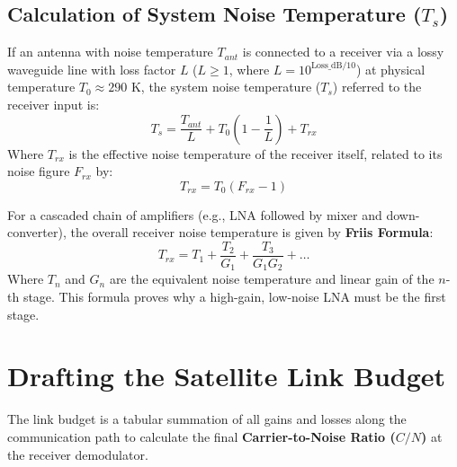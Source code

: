 \documentclass[12pt,a4paper]{article}
\begin{document}
\subsection{Calculation of System Noise Temperature ($T_s$)}
If an antenna with noise temperature $T_{ant}$ is connected to a receiver via a lossy waveguide line with loss factor $L$ ($L \ge 1$, where $L = 10^{\text{Loss\_dB}/10}$) at physical temperature $T_0 \approx 290\text{ K}$, the system noise temperature ($T_s$) referred to the receiver input is:
\begin{equation}
  T_s = \frac{T_{ant}}{L} + T_{0}\left(1 - \frac{1}{L}\right) + T_{rx}
\end{equation}
Where $T_{rx}$ is the effective noise temperature of the receiver itself, related to its noise figure $F_{rx}$ by:
\begin{equation}
  T_{rx} = T_0 (F_{rx} - 1)
\end{equation}

For a cascaded chain of amplifiers (e.g., LNA followed by mixer and down-converter), the overall receiver noise temperature is given by \textbf{Friis Formula}:
\begin{equation}
  T_{rx} = T_1 + \frac{T_2}{G_1} + \frac{T_3}{G_1 G_2} + \dots
\end{equation}
Where $T_n$ and $G_n$ are the equivalent noise temperature and linear gain of the $n$-th stage. This formula proves why a high-gain, low-noise LNA must be the first stage.

\section{Drafting the Satellite Link Budget}

The link budget is a tabular summation of all gains and losses along the communication path to calculate the final \textbf{Carrier-to-Noise Ratio ($C/N$)} at the receiver demodulator.

\begin{tcolorbox}[tikzbox, title={Link Budget System Model}]
\centering
{}
\end{tcolorbox}
\end{document}
